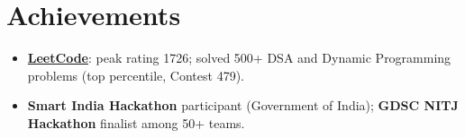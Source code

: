 \documentclass[letterpaper,10.5pt]{article}
\newcommand{\resumeItem}[1]{
  \item\small{#1 \vspace{-2pt}}
}
\newcommand{\resumeItemListStart}{\begin{itemize}[leftmargin=0.2in]}
\newcommand{\resumeItemListEnd}{\end{itemize}\vspace{-5pt}}
\begin{document}
\section{Achievements}
  \resumeItemListStart
    \resumeItem{\textbf{\href{https://leetcode.com/u/Tech_tonic/}{LeetCode}}: peak rating 1726; solved 500+ DSA and Dynamic Programming problems (top percentile, Contest 479).}
    \resumeItem{\textbf{Smart India Hackathon} participant (Government of India); \textbf{GDSC NITJ Hackathon} finalist among 50+ teams.}
  \resumeItemListEnd
\end{document}
